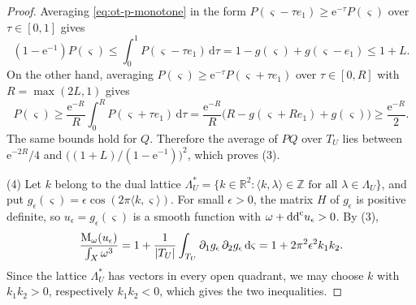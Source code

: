 \begin{proof}
Averaging \eqref{eq:ot-p-monotone} in the form $P(\varsigma-\tau e_1)\geq\mathrm e^{-\tau}P(\varsigma)$ over $\tau\in[0,1]$ gives
\[
 (1-\mathrm e^{-1})P(\varsigma)\leq\int_0^1P(\varsigma-\tau e_1)\,\mathrm d\tau
 =1-g(\varsigma)+g(\varsigma-e_1)\leq1+L.
\]
On the other hand, averaging $P(\varsigma)\geq\mathrm e^{-\tau}P(\varsigma+\tau e_1)$ over $\tau\in[0,R]$ with $R=\max(2L,1)$ gives
\[
 P(\varsigma)\geq\frac{\mathrm e^{-R}}R\int_0^RP(\varsigma+\tau e_1)\,\mathrm d\tau
 =\frac{\mathrm e^{-R}}R\bigl(R-g(\varsigma+Re_1)+g(\varsigma)\bigr)
 \geq\frac{\mathrm e^{-R}}2.
\]
The same bounds hold for $Q$. Therefore the average of $PQ$ over $T_U$ lies between $\mathrm e^{-2R}/4$ and $\bigl((1+L)/(1-\mathrm e^{-1})\bigr)^2$, which proves (3).

(4) Let $k$ belong to the dual lattice $\Lambda_U^*=\{k\in\mathbb R^2:\langle k,\lambda\rangle\in\mathbb Z\text{ for all }\lambda\in\Lambda_U\}$, and put $g_\epsilon(\varsigma)=\epsilon\cos(2\pi\langle k,\varsigma\rangle)$. For small $\epsilon>0$, the matrix $H$ of $g_\epsilon$ is positive definite, so $u_\epsilon=g_\epsilon(\varsigma)$ is a smooth function with $\omega+\mathrm{dd}^{\mathrm{c}} u_\epsilon>0$. By (3),
\[
 \frac{\mathrm M_\omega(u_\epsilon)}{\int_X\omega^3}
 =1+\frac1{|T_U|}\int_{T_U}\partial_1g_\epsilon\,\partial_2g_\epsilon\,\mathrm d\varsigma
 =1+2\pi^2\epsilon^2k_1k_2.
\]
Since the lattice $\Lambda_U^*$ has vectors in every open quadrant, we may choose $k$ with $k_1k_2>0$, respectively $k_1k_2<0$, which gives the two inequalities.
\end{proof}

